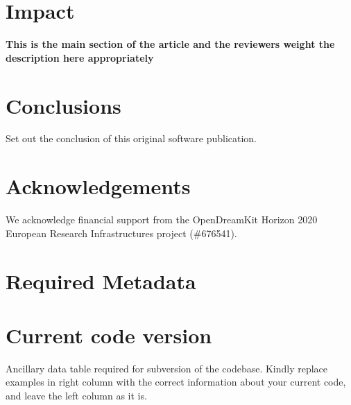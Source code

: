 \documentclass[preprint,12pt, a4paper]{elsarticle}
\begin{document}

\section{Impact}
\label{}

\textbf{This is the main section of the article and the reviewers weight the description here appropriately}


\section{Conclusions}
\label{}

Set out the conclusion of this original software publication.

\section*{Acknowledgements}
\label{}
We acknowledge financial support from the OpenDreamKit Horizon 2020 European Research Infrastructures project (\#676541).


 


\section*{Required Metadata}
\label{}

\section*{Current code version}
\label{}

Ancillary data table required for subversion of the codebase. Kindly replace examples in right column with the correct information about your current code, and leave the left column as it is.
\end{document}
